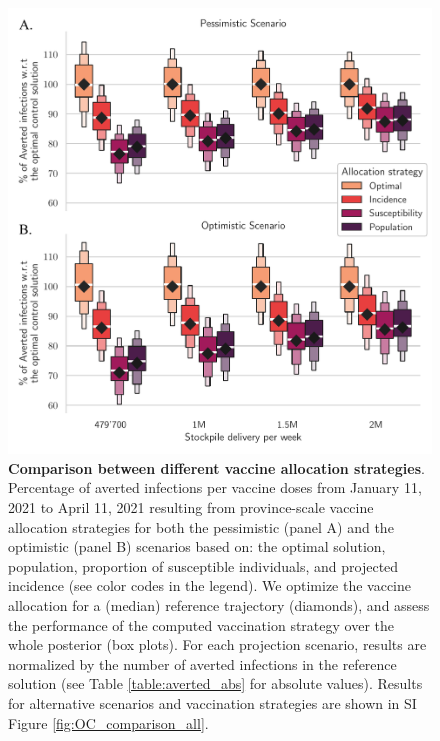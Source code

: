 \begin{figure}[!ht]
    \centering
    \includegraphics[width=\textwidth]{fig_italy-ocp/figures/scenarios_perturb_all.pdf}
    \caption[Comparison between different vaccine allocation strategies]{\textbf{Comparison between different vaccine allocation strategies}. Percentage of averted infections per vaccine doses from January 11, 2021 to April 11, 2021 resulting from province-scale vaccine allocation strategies for both the pessimistic (panel A) and the optimistic (panel B) scenarios based on: the optimal solution, population, proportion of susceptible individuals, and projected incidence (see color codes in the legend). We optimize the vaccine allocation for a (median) reference trajectory (diamonds), and assess the performance of the computed vaccination strategy over the whole posterior (box plots). For each projection scenario, results are normalized by the number of averted infections in the reference solution (see Table \ref{table:averted_abs} for absolute values). Results for alternative scenarios and vaccination strategies are shown in SI Figure \ref{fig:OC_comparison_all}.}
    \label{fig:OC_comparison}
\end{figure}

